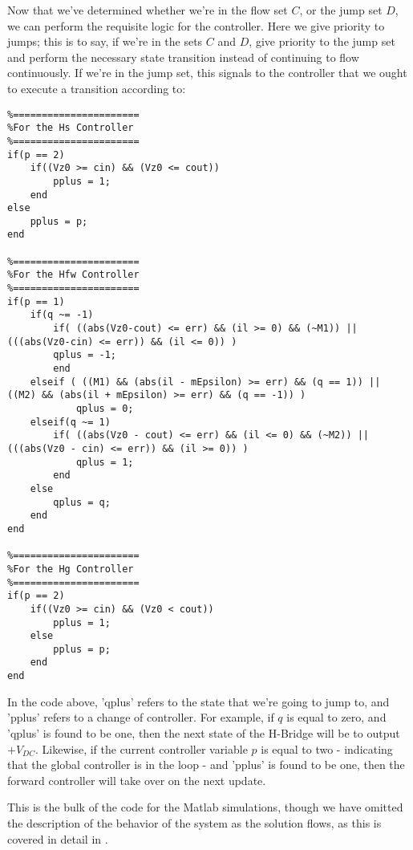 Now that we've determined whether we're in the flow set $C$, or the jump set $D$, we can perform the requisite logic for the controller. Here we give priority to jumps; this is to say, if we're in the sets $C$ and $D$, give priority to the jump set and perform the necessary state transition instead of continuing to flow continuously. If we're in the jump set, this signals to the controller that we ought to execute a transition according to:

\begin{lstlisting}
%======================
%For the Hs Controller
%======================
if(p == 2)
    if((Vz0 >= cin) && (Vz0 <= cout))
        pplus = 1;
    end
else
    pplus = p;    
end

%======================
%For the Hfw Controller
%======================
if(p == 1)    
    if(q ~= -1)
        if( ((abs(Vz0-cout) <= err) && (il >= 0) && (~M1)) || (((abs(Vz0-cin) <= err)) && (il <= 0)) )
        qplus = -1;
        end
    elseif ( ((M1) && (abs(il - mEpsilon) >= err) && (q == 1)) || ((M2) && (abs(il + mEpsilon) >= err) && (q == -1)) )
            qplus = 0;
    elseif(q ~= 1)
        if( ((abs(Vz0 - cout) <= err) && (il <= 0) && (~M2)) || (((abs(Vz0 - cin) <= err)) && (il >= 0)) )
            qplus = 1;
        end
    else
        qplus = q;        
    end
end

%======================
%For the Hg Controller
%======================
if(p == 2)
    if((Vz0 >= cin) && (Vz0 < cout))
        pplus = 1;
    else
        pplus = p;
    end
end
\end{lstlisting}

In the code above, 'qplus' refers to the state that we're going to jump to, and 'pplus' refers to a change of controller. For example, if $q$ is equal to zero, and 'qplus' is found to be one, then the next state of the H-Bridge will be to output $+V_{DC}$. Likewise, if the current controller variable $p$ is equal to two - indicating that the global controller is in the loop - and 'pplus' is found to be one, then the forward controller will take over on the next update. 

This is the bulk of the code for the Matlab simulations, though we have omitted the description of the behavior of the system as the solution flows, as this is covered in detail in \cite{ricardo}.

